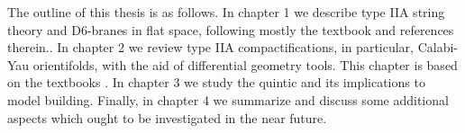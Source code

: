 
The outline of this thesis is as follows.
In chapter 1 we describe type IIA string theory and D6-branes in flat space, following mostly the textbook \cite{Ibanez} and references
therein.. 
In chapter 2 we review type IIA compactifications, in particular, Calabi-Yau orientifolds, with the aid of differential geometry tools.
This chapter is based on the textbooks \cite{Ibanez}\cite{GSW1}\cite{GSW2}.
In chapter 3 we study the quintic and its implications to model building.
Finally, in chapter 4 we summarize and discuss some additional aspects which ought to be investigated in the near future.
